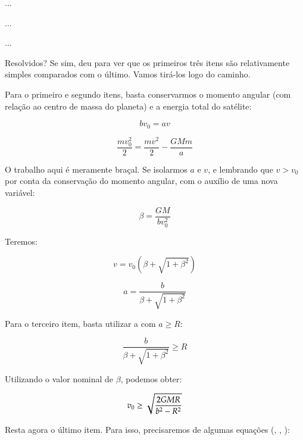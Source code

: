 ...

...

...{\\}

Resolvidos? Se sim, deu para ver que os primeiros três itens são relativamente simples comparados com o último. Vamos tirá-los logo do caminho.{\\}

Para o primeiro e segundo itens, basta conservarmos o momento angular (com relação ao centro de massa do planeta) e a energia total do satélite:

\begin{equation}
	bv_0 = av 	\label{eq84}
\end{equation}

\begin{equation}
	\frac{mv_0^2}{2} = \frac{mv^2}{2} - \frac{GMm}{a}	\label{eq85}
\end{equation}

O trabalho aqui é meramente braçal. Se isolarmos $a$ e $v$, e lembrando que $v > v_0$ por conta da conservação do momento angular, com o auxílio de uma nova variável:

\begin{equation}
	\beta = \frac{GM}{bv_0^2}	\label{eq86}
\end{equation}

Teremos:

\begin{equation}
	v = v_0 \left(\beta + \sqrt{1 + \beta^2} \right)	\label{eq87}
\end{equation}

\begin{equation}
	a = \frac{b}{\beta + \sqrt{1 + \beta^2}}			\label{eq88}
\end{equation}

Para o terceiro item, basta utilizar a  com $a \geq R$:

\begin{equation}
	\frac{b}{\beta + \sqrt{1 + \beta^2}} \geq R			\label{eq89}
\end{equation}

Utilizando o valor nominal de $\beta$, podemos obter:

\begin{equation}
	v_0 \geq \sqrt{\frac{2GMR}{b^2 - R^2}}					\label{eq90}
\end{equation}

Resta agora o último item. Para isso, precisaremos de algumas equações (, , ):

